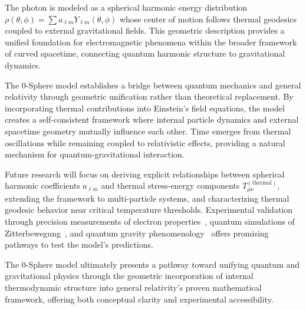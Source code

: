 \documentclass[%
 reprint,
 amsmath,amssymb,
 aps,
]{revtex4-1}
\numberwithin{equation}{section}%
\begin{document}
The photon is modeled as a spherical harmonic energy distribution $\rho(\theta,\phi) = \sum a_{\ell m} Y_{\ell m}(\theta,\phi)$ whose center of motion follows thermal geodesics coupled to external gravitational fields. This geometric description provides a unified foundation for electromagnetic phenomena within the broader framework of curved spacetime, connecting quantum harmonic structure to gravitational dynamics.

The 0-Sphere model establishes a bridge between quantum mechanics and general relativity through geometric unification rather than theoretical replacement. By incorporating thermal contributions into Einstein's field equations, the model creates a self-consistent framework where internal particle dynamics and external spacetime geometry mutually influence each other. Time emerges from thermal oscillations while remaining coupled to relativistic effects, providing a natural mechanism for quantum-gravitational interaction.

Future research will focus on deriving explicit relationships between spherical harmonic coefficients $a_{\ell m}$ and thermal stress-energy components $T_{\mu\nu}^{(\text{thermal})}$, extending the framework to multi-particle systems, and characterizing thermal geodesic behavior near critical temperature thresholds. Experimental validation through precision measurements of electron properties~\cite{fan2023}, quantum simulations of Zitterbewegung~\cite{gerritsma2010, leblanc2013}, and quantum gravity phenomenology~\cite{amelino-camelia2002} offers promising pathways to test the model's predictions.

The 0-Sphere model ultimately presents a pathway toward unifying quantum and gravitational physics through the geometric incorporation of internal thermodynamic structure into general relativity's proven mathematical framework, offering both conceptual clarity and experimental accessibility.
\end{document}
